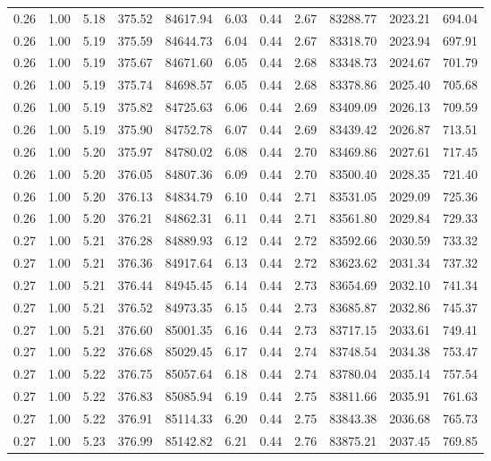 \begin{table}[!ht]
\begin{tabular}{rrrrrrrrrrr}
0.26 & 1.00 & 5.18 & 375.52 & 84617.94 & 6.03 & 0.44 & 2.67 & 83288.77 & 2023.21 & 694.04 \\
0.26 & 1.00 & 5.19 & 375.59 & 84644.73 & 6.04 & 0.44 & 2.67 & 83318.70 & 2023.94 & 697.91 \\
0.26 & 1.00 & 5.19 & 375.67 & 84671.60 & 6.05 & 0.44 & 2.68 & 83348.73 & 2024.67 & 701.79 \\
0.26 & 1.00 & 5.19 & 375.74 & 84698.57 & 6.05 & 0.44 & 2.68 & 83378.86 & 2025.40 & 705.68 \\
0.26 & 1.00 & 5.19 & 375.82 & 84725.63 & 6.06 & 0.44 & 2.69 & 83409.09 & 2026.13 & 709.59 \\
0.26 & 1.00 & 5.19 & 375.90 & 84752.78 & 6.07 & 0.44 & 2.69 & 83439.42 & 2026.87 & 713.51 \\
0.26 & 1.00 & 5.20 & 375.97 & 84780.02 & 6.08 & 0.44 & 2.70 & 83469.86 & 2027.61 & 717.45 \\
0.26 & 1.00 & 5.20 & 376.05 & 84807.36 & 6.09 & 0.44 & 2.70 & 83500.40 & 2028.35 & 721.40 \\
0.26 & 1.00 & 5.20 & 376.13 & 84834.79 & 6.10 & 0.44 & 2.71 & 83531.05 & 2029.09 & 725.36 \\
0.26 & 1.00 & 5.20 & 376.21 & 84862.31 & 6.11 & 0.44 & 2.71 & 83561.80 & 2029.84 & 729.33 \\
0.27 & 1.00 & 5.21 & 376.28 & 84889.93 & 6.12 & 0.44 & 2.72 & 83592.66 & 2030.59 & 733.32 \\
0.27 & 1.00 & 5.21 & 376.36 & 84917.64 & 6.13 & 0.44 & 2.72 & 83623.62 & 2031.34 & 737.32 \\
0.27 & 1.00 & 5.21 & 376.44 & 84945.45 & 6.14 & 0.44 & 2.73 & 83654.69 & 2032.10 & 741.34 \\
0.27 & 1.00 & 5.21 & 376.52 & 84973.35 & 6.15 & 0.44 & 2.73 & 83685.87 & 2032.86 & 745.37 \\
0.27 & 1.00 & 5.21 & 376.60 & 85001.35 & 6.16 & 0.44 & 2.73 & 83717.15 & 2033.61 & 749.41 \\
0.27 & 1.00 & 5.22 & 376.68 & 85029.45 & 6.17 & 0.44 & 2.74 & 83748.54 & 2034.38 & 753.47 \\
0.27 & 1.00 & 5.22 & 376.75 & 85057.64 & 6.18 & 0.44 & 2.74 & 83780.04 & 2035.14 & 757.54 \\
0.27 & 1.00 & 5.22 & 376.83 & 85085.94 & 6.19 & 0.44 & 2.75 & 83811.66 & 2035.91 & 761.63 \\
0.27 & 1.00 & 5.22 & 376.91 & 85114.33 & 6.20 & 0.44 & 2.75 & 83843.38 & 2036.68 & 765.73 \\
0.27 & 1.00 & 5.23 & 376.99 & 85142.82 & 6.21 & 0.44 & 2.76 & 83875.21 & 2037.45 & 769.85 \\

\end{tabular}
\end{table}
